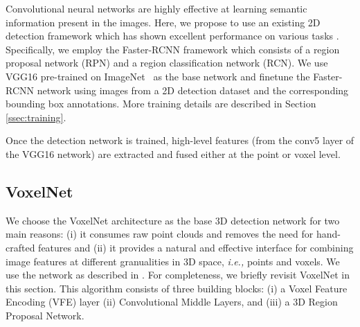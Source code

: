 \documentclass[letterpaper, 10 pt, conference]{ieeeconf}
\begin{document}
Convolutional neural networks are highly effective at learning semantic information present in the images. Here, we propose to use an existing 2D detection framework which has shown excellent performance on various tasks \cite{lin2014microsoft,everingham2010pascal,imagenet_cvpr09}. Specifically, we employ the Faster-RCNN framework \cite{ren2015faster} which consists of a region proposal network (RPN) and a region classification network (RCN). We use VGG16 \cite{simonyan2014very} pre-trained on ImageNet~\cite{REF:ILSVRC15} as the base network and finetune the Faster-RCNN network using images from a 2D detection dataset and the corresponding bounding box annotations. More training details are described in Section \ref{ssec:training}.

Once the detection network is trained, high-level features (from the conv5 layer of the VGG16 network) are extracted and fused either at the point or voxel level. 


\subsection{VoxelNet}

We choose the VoxelNet architecture as the base 3D detection network for two main reasons: (i) it consumes raw point clouds and removes the need for hand-crafted features and (ii) it provides a natural and effective interface for combining image features at different granualities in 3D space, \textit{i.e.,} points and voxels. 
We use the network as described in \cite{REF:zhou2017voxelnet}. For completeness, we briefly revisit VoxelNet in this section. This algorithm consists of three building blocks: (i) a Voxel Feature Encoding (VFE) layer (ii) Convolutional Middle Layers, and (iii) a 3D Region Proposal Network. 
\end{document}
